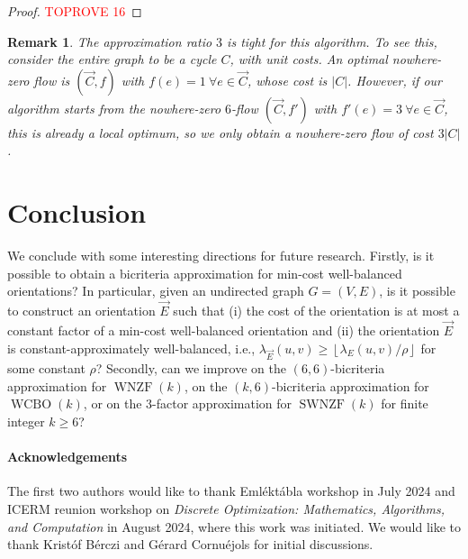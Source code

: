 \documentclass[11pt]{article}
\newtheorem{remark}{Remark}
\newcommand{\rounddown}[1]{\left\lfloor#1\right\rfloor}
\begin{document}
\begin{proof}\textcolor{red}{TOPROVE 16}\end{proof}

\begin{remark}
    The approximation ratio $3$ is tight for this algorithm. To see this, consider the entire graph to be a cycle $C$, with unit costs. An optimal nowhere-zero flow is $(\vec{C},f)$ with $f(e)=1\ \forall e\in\vec{C}$, whose cost is $|C|$. However, if our algorithm starts from the nowhere-zero $6$-flow $(\vec{C},f')$ with $f'(e)=3\ \forall e\in\vec{C}$, this is already a local optimum, so we only obtain a nowhere-zero flow of cost $3|C|$.
\end{remark}



\section{Conclusion}
We conclude with some interesting directions for future research. Firstly, is it possible to obtain a bicriteria approximation for min-cost well-balanced orientations? In particular, given an undirected graph $G=(V, E)$, is it possible to construct an orientation $\vec{E}$ such that (i) the cost of the orientation is at most a constant factor of a min-cost well-balanced orientation and (ii) the orientation $\vec{E}$ is constant-approximately well-balanced, i.e., $\lambda_{\vec{E}}(u,v)\ge \rounddown{\lambda_E(u,v)/\rho}$ for some constant $\rho$? Secondly, can we improve on the $(6,6)$-bicriteria approximation for $\operatorname{WNZF}(k)$, on the $(k,6)$-bicriteria approximation for $\operatorname{WCBO}(k)$, or on the $3$-factor approximation for $\operatorname{SWNZF}(k)$ for finite integer $k\ge 6$?






\paragraph*{Acknowledgements} The first two authors would like to thank Eml\'ekt\'abla workshop in July 2024 and ICERM reunion workshop on \emph{Discrete Optimization: Mathematics, Algorithms, and Computation} in August 2024, where this work was initiated. We would like to thank Krist\'of B\'erczi and G\'erard Cornu\'ejols for initial discussions.



 
\end{document}
